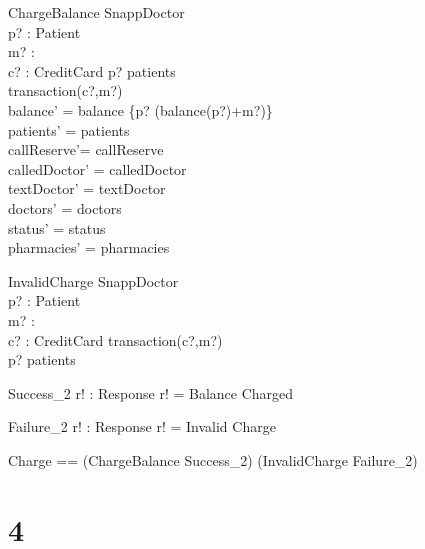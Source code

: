 \documentclass{article}
\begin{document}
\begin{schema}{ChargeBalance}
\Delta SnappDoctor\\
p? : Patient\\
m? : \nat\\
c? : CreditCard
\where
p? \in patients\\
transaction(c?,m?)\\
balance' = balance \oplus \{p? \mapsto (balance(p?)+m?)\}\\
patients' = patients\\ 
callReserve'= callReserve\\
calledDoctor' = calledDoctor\\
textDoctor' = textDoctor\\
doctors' = doctors\\
status' = status\\
pharmacies' = pharmacies
\end{schema}

\begin{schema}{InvalidCharge}
\Xi SnappDoctor\\
p? : Patient\\
m? : \nat\\
c? : CreditCard
\where
\neg transaction(c?,m?)\\
p? \notin patients
\end{schema}

\begin{schema}{Success_2}
r! : Response
\where
r! = Balance Charged
\end{schema}

\begin{schema}{Failure_2}
r! : Response
\where
r! = Invalid Charge
\end{schema}

\begin{zed}
Charge == (ChargeBalance \land Success_2) \lor (InvalidCharge \land Failure_2)
\end{zed}

\section*{4}
\end{document}
